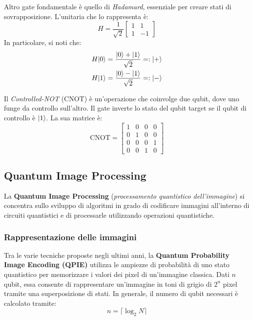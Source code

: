Altro gate fondamentale è quello di \emph{Hadamard}\label{txt:hadamard}, essenziale per creare stati
di sovrapposizione. L'unitaria che lo rappresenta è:
\[
	H = \frac{1}{\sqrt 2}\begin{bmatrix}
			1 & 1\\
			1 & -1
		\end{bmatrix}
\]
In particolare, si noti che:
\begin{align}
	H\lvert0\rangle &= \frac{\lvert0\rangle + \lvert1\rangle}{\sqrt 2} =: \lvert+\rangle \\
	H\lvert1\rangle &= \frac{\lvert0\rangle - \lvert1\rangle}{\sqrt 2} =: \lvert-\rangle
\end{align}

Il \emph{Controlled-NOT} (CNOT) è un'operazione che coinvolge due qubit, dove
uno funge da controllo sull'altro. Il gate inverte lo stato del qubit target se il qubit di controllo è $\lvert1\rangle$. La sua matrice è:
\[
	\text{CNOT} = \begin{bmatrix}
		1 & 0 & 0 & 0\\
		0 & 1 & 0 & 0\\
		0 & 0 & 0 & 1\\
		0 & 0 & 1 & 0
	\end{bmatrix}
\]
\subsection{Quantum Image Processing}

La \textbf{Quantum Image Processing} (\emph{processamento quantistico
dell'immagine}) si concentra sullo sviluppo di algoritmi in grado di codificare immagini all’interno di circuiti quantistici e di processarle utilizzando operazioni quantistiche. 

\subsubsection*{Rappresentazione delle immagini}\label{sec:img-rappr} Tra le varie tecniche proposte negli
ultimi anni, la \textbf{Quantum Probability Image Encoding (QPIE)} \cite{qpie} utilizza le ampiezze di probabilità di uno stato quantistico per memorizzare i valori dei pixel di un'immagine classica. Dati $n$ qubit, essa consente di rappresentare un'immagine in toni di grigio di $2^n$ pixel tramite una superposizione di stati. In generale, il numero di qubit necessari è calcolato tramite:
\begin{equation}
	n = \lceil{\log_2{N}}\rceil
	\label{eq:qpie-n-qubit}
\end{equation}

